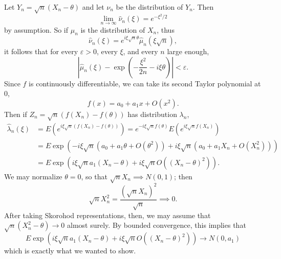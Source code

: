 \documentclass[10pt]{article}
\theoremstyle{definition}
\begin{document}
Let $Y_n = \sqrt n(X_n - \theta)$ and let $\nu_n$ be the distribution of $Y_n$. Then
$$\lim_{n \to \infty} \hat \nu_n(\xi) = e^{-\xi^2/2}$$
by assumption. So if $\mu_n$ is the distribution of $X_n$, thus
$$\hat \nu_n(\xi) = e^{i\xi \sqrt n \theta} \hat \mu_n(\xi \sqrt n),$$
it follows that for every $\varepsilon > 0$, every $\xi$, and every $n$ large enough,
$$\left|\hat \mu_n(\xi) - \exp\left(-\frac{\xi^2}{2n} - i\xi\theta\right)\right| < \varepsilon.$$
Since $f$ is continuously differentiable, we can take its second Taylor polynomial at $0$,
$$f(x) = a_0 + a_1x + O(x^2).$$
Then if $Z_n = \sqrt n(f(X_n) - f(\theta))$ has distribution $\lambda_n$,
\begin{align*}
\hat \lambda_n(\xi) &= E(e^{i\xi \sqrt n(f(X_n) - f(\theta))}) = e^{-i\xi \sqrt n f(\theta)} E(e^{i\xi \sqrt n f(X_n)}) \\
&= E\exp\left(-i\xi \sqrt n(a_0 + a_1\theta + O(\theta^2)) + i\xi \sqrt n(a_0 + a_1 X_n + O(X_n^2)) \right)\\
&= E\exp\left(i\xi \sqrt na_1(X_n - \theta) + i\xi \sqrt n O((X_n - \theta)^2) \right).
\end{align*}
We may normalize $\theta = 0$, so that $\sqrt nX_n \implies N(0, 1)$; then
$$\sqrt nX_n^2 = \frac{(\sqrt nX_n)^2}{\sqrt n} \implies 0.$$
After taking Skorohod representations, then, we may assume that $\sqrt n(X_n^2 - \theta) \to 0$ almost surely.
By bounded convergence, this implies that
$$E\exp\left(i\xi \sqrt na_1(X_n - \theta) + i\xi \sqrt n O((X_n - \theta)^2) \right) \to N(0, a_1)$$
which is exactly what we wanted to show.
\end{document}
